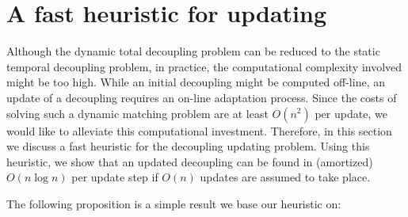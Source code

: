 \section{A fast heuristic for updating} \label{section:heuristic}
Although the dynamic total decoupling problem can be reduced to the static temporal decoupling problem, in practice, the computational complexity involved might be too high. While an initial decoupling might be computed off-line, an update of a decoupling requires an on-line adaptation process. Since the costs of solving such a dynamic matching problem are at  least $O(n^2)$ per update, we would like to alleviate this computational investment. Therefore, in this section we discuss a fast heuristic for the decoupling updating problem.
Using this heuristic, we show that an updated decoupling can be found in (amortized) $O(n \log n)$ per update step if $O(n)$ updates are assumed to take place.

The following proposition is a simple result we base our heuristic on:

